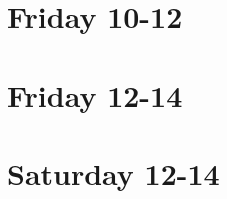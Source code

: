 \tableofcontents

\clearpage

\section{Friday 10-12}







\clearpage

\section{Friday 12-14}







\clearpage

\section{Saturday 12-14}




